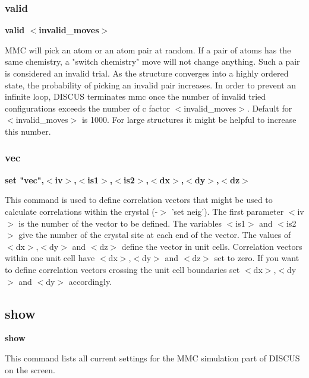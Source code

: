 \subsubsection{valid}
{\bf valid $ <$invalid\_moves$> $ \par }
\par
\vspace{3pt}
MMC will pick an atom or an atom pair at random. If a pair of atoms 
has the same chemistry, a "switch chemistry" move will not change 
anything. Such a pair is considered an invalid trial. As the structure 
converges into a highly ordered state, the probability of picking 
an invalid pair increases. In order to prevent an infinite loop, 
DISCUS terminates mmc once the number of invalid tried configurations 
exceeds the number of c factor $ <$invalid\_moves$> $. Default for 
$ <$invalid\_moves$> $ is 1000. For large structures it might be helpful to 
increase this number. 
\subsubsection{vec}
{\bf set "vec",$ <$iv$> $,$ <$is1$> $,$ <$is2$> $,$ <$dx$> $,$ <$dy$> $,$ <$dz$> $ \par }
\par
\vspace{3pt}
This command is used to define correlation vectors that might be used 
to calculate correlations within the crystal (-$> $ 'set neig'). The 
first parameter $ <$iv$> $ is the number of the vector to be defined. The 
variables $ <$is1$> $ and $ <$is2$> $ give the number of the crystal site at each 
end of the vector. The values of $ <$dx$> $,$ <$dy$> $ and $ <$dz$> $ define the vector 
in unit cells. Correlation vectors within one unit cell have $ <$dx$> $,$ <$dy$> $ 
and $ <$dz$> $ set to zero. If you want to define correlation vectors crossing 
the unit cell boundaries set $ <$dx$> $,$ <$dy$> $ and $ <$dy$> $ accordingly. 
\subsection*{show}
{\bf show \par }
\par
\vspace{3pt}
This command lists all current settings for the MMC simulation part 
of DISCUS on the screen. 
